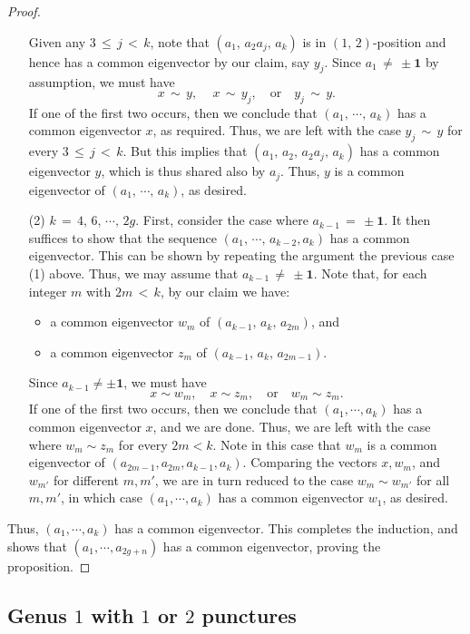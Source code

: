 \documentclass[reqno]{amsart}
\theoremstyle{plain}
\theoremstyle{definition}
\theoremstyle{remark}
\begin{document}
\begin{proof}
\begin{enumerate}
Given any $3\,\leq\, j\,<\,k$, note that $(a_1,\,a_2a_j,\,a_k)$ is in $(1,\,2)$-position and hence has a common
eigenvector by our claim, say $y_j$. Since $a_1\,\neq\,\pm\mathbf 1$ by assumption, we must have
	$$x\,\sim\, y,\,\quad x\,\sim\, y_j,\quad\text{or}\quad y_j\,\sim\, y.$$
	If one of the first two occurs, then we conclude that $(a_1,\,\cdots,\,a_k)$ has a common eigenvector
$x$, as required. Thus, we are left with the case $y_j\,\sim\, y$ for every $3\,\leq\, j\,<\,k$. But this implies
that $(a_1,\,a_2,\,a_2a_j,\,a_k)$ has a common eigenvector $y$, which is thus shared also by $a_j$. Thus, $y$ is
a common eigenvector of $(a_1,\,\cdots,\,a_k)$, as desired.
	
	\item[\textup{(2)}] $k\,=\,4,\,6,\,\cdots,\,2g$. First, consider the case where $a_{k-1}\,=\,
\pm\mathbf 1$. It then suffices to show that the sequence $(a_1,\,\cdots,\,a_{k-2},a_k)$ has a common
eigenvector. This can be shown by repeating the argument the previous case (1) above. Thus, we may assume that
$a_{k-1}\,\neq\,\pm\mathbf 1$. Note that, for each integer $m$ with $2m\,<\,k$, by our claim we have:
	\begin{itemize}
		\item a common eigenvector $w_m$ of $(a_{k-1},\,a_k,\, a_{2m})$, and
		\item a common eigenvector $z_m$ of $(a_{k-1},\,a_k,\, a_{2m-1})$.
	\end{itemize}
	Since $a_{k-1}\neq\pm\mathbf 1$, we must have
	$$x\sim w_m,\quad x\sim z_m,\quad\text{or}\quad w_m\sim z_m.$$
	If one of the first two occurs, then we conclude that $(a_1,\cdots,a_k)$ has a common eigenvector $x$, and we are done. Thus, we are left with the case where $w_m\sim z_m$ for every $2m<k$. Note in this case that $w_m$ is a common eigenvector of $(a_{2m-1},a_{2m},a_{k-1},a_k)$. Comparing the vectors $x,w_m$, and $w_{m'}$ for different $m,m'$, we are in turn reduced to the case $w_m\sim w_{m'}$ for all $m,m'$, in which case $(a_1,\cdots,a_k)$ has a common eigenvector $w_1$, as desired.
\end{enumerate}
Thus, $(a_1,\cdots,a_k)$ has a common eigenvector. This completes the induction, and shows that $(a_1,\cdots,a_{2g+n})$ has a common eigenvector, proving the proposition.
\end{proof}

\subsection{Genus $1$ with $1$ or $2$ punctures}\label{sec-g1n2}
\end{document}
